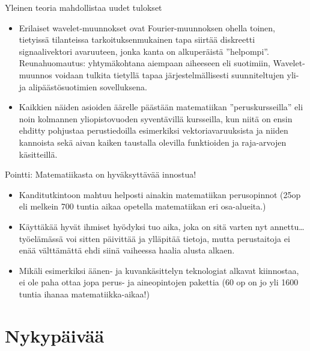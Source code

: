 \documentclass[pdf,10pt,handout]{beamer}
\begin{document}
\begin{frame}{Yleinen teoria mahdollistaa uudet tulokset}
\begin{itemize}
\item
  Erilaiset wavelet-muunnokset \cite{daubechies1990wavelet} ovat
  Fourier-muunnoksen ohella toinen, tietyissä tilanteissa
  tarkoituksenmukainen tapa siirtää diskreetti signaalivektori
  avaruuteen, jonka kanta on alkuperäistä
  ''helpompi''. Reunahuomautus: yhtymäkohtana aiempaan aiheeseen eli
  suotimiin, Wavelet-muunnos voidaan tulkita tietyllä tapaa
  järjestelmällisesti suunniteltujen yli- ja alipäästösuotimien
  sovelluksena.
\item
  Kaikkien näiden asioiden äärelle päästään matematiikan
  ''peruskursseilla'' eli noin kolmannen yliopistovuoden syventävillä
  kursseilla, kun niitä on ensin ehditty pohjustaa perustiedoilla
  esimerkiksi vektoriavaruuksista ja niiden kannoista sekä aivan
  kaiken taustalla olevilla funktioiden ja raja-arvojen käsitteillä.
\end{itemize}
\end{frame}

\begin{frame}{Pointti: Matematiikasta on hyväksyttävää innostua!}

\begin{itemize}
\item
  Kanditutkintoon mahtuu helposti ainakin matematiikan perusopinnot
  (25op eli melkein 700 tuntia aikaa opetella matematiikan eri
  osa-alueita.)
\item
  Käyttäkää hyvät ihmiset hyödyksi tuo aika, joka on sitä varten nyt
  annettu\ldots työelämässä voi sitten päivittää ja ylläpitää tietoja,
  mutta perustaitoja ei enää välttämättä ehdi siinä vaiheessa haalia
  alusta alkaen.
\item
  Mikäli esimerkiksi äänen- ja kuvankäsittelyn teknologiat alkavat
  kiinnostaa, ei ole paha ottaa jopa perus- ja aineopintojen
  pakettia (60 op on jo yli 1600 tuntia ihanaa matematiikka-aikaa!)
\end{itemize}
\end{frame}




\section{Nykypäivää}
\end{document}
